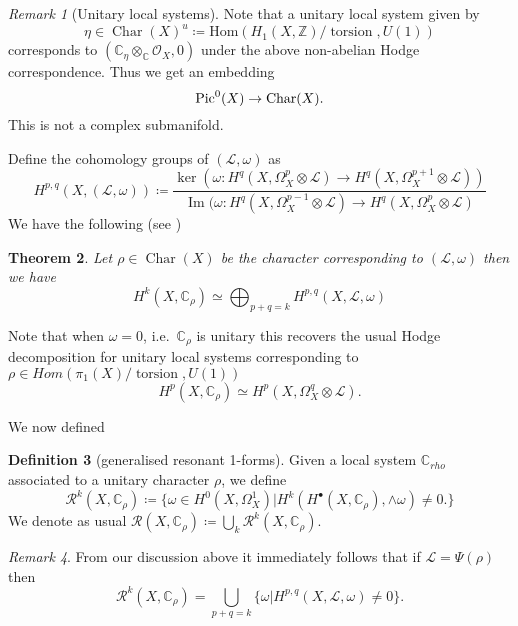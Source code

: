 \documentclass[12pt,reqno]{amsart}
\newtheorem{theorem}{Theorem}[section]
\theoremstyle{question}
\theoremstyle{definition}
\newtheorem{definition}[theorem]{Definition}
\theoremstyle{remark}
\newtheorem{remark}[theorem]{Remark}
\theoremstyle{cited}
\theoremstyle{citeddef}
\newcommand{\Hom}{\mathrm{Hom}}
\DeclareMathOperator{\Char}{Char}
\DeclareMathOperator{\im}{Im}
\def\Pic{{\rm Pic}}
\newcommand{\sL}{\mathcal{L}}
\newcommand{\sO}{\mathcal{O}}
\newcommand{\sR}{\mathcal{R}}
\newcommand{\bbC}{\mathbb{C}}
\newcommand{\bbZ}{\mathbb{Z}}
\DeclareMathOperator{\torsion}{torsion}
\begin{document}
\begin{remark}[Unitary local systems]
Note that a unitary local system given by
\[\eta\in\Char(X)^u \coloneqq \Hom(H_1(X,\bbZ)/\torsion , U(1))\]
corresponds to $(\bbC_{\eta}\otimes_{\bbC}\sO_X, 0)$
under the above non-abelian Hodge correspondence. Thus
we get an embedding 
\[\Pic^0(X) \to \Char(X).\]
This is not a complex submanifold.

\end{remark}

Define the cohomology groups of 
$(\sL, \omega)$ as
\[H^{p,q}(X, (\sL, \omega)) \coloneqq 
\frac{\ker(\omega\colon H^q(X, \Omega_X^p\otimes \sL)
\to H^q(X, \Omega_X^{p+1}\otimes\sL))}{\im(\omega\colon
H^q(X,\Omega_X^{p-1}\otimes\sL)\to H^q(X,\Omega_X^{p}\otimes\sL)}\]
We have the following (see \cite[Theorem 3]{Ara92})
\begin{theorem}
Let $\rho\in \Char(X)$ be the character corresponding to 
$(\sL,\omega)$ then we have
\[H^k(X, \bbC_{\rho}) \simeq \bigoplus_{p+q =k}H^{p,q}(X,\sL,\omega)\]
\label{thm:genhodgedecomp}
\end{theorem}

Note that when $\omega = 0$, i.e.\ $\bbC_{\rho}$ is unitary
this recovers the usual Hodge decomposition for 
unitary local systems corresponding to $\rho \in Hom(\pi_1(X)/\torsion, U(1))$
\[H^p(X, \bbC_{\rho}) \simeq H^p(X, \Omega_X^q\otimes\sL).\]

We now defined
\begin{definition}[generalised resonant 1-forms]
Given a local system $\bbC_{rho}$ associated to a unitary character $\rho$, we define
\[\sR^k(X, \bbC_{\rho}) \coloneqq
\{\omega\in H^0(X, \Omega_X^1)| H^k(H^{\bullet}(X, \bbC_{\rho}), \wedge\omega) \neq 0 .\}\]
We denote as usual 
$\sR(X, \bbC_{\rho}) \coloneqq \bigcup_k \sR^k(X, \bbC_{\rho})$.
\end{definition}

\begin{remark}
From our discussion above it immediately follows that
if $\sL = \Psi(\rho)$ then
\[\sR^k(X, \bbC_{\rho}) =\bigcup_{p+q = k} \{\omega| H^{p,q}(X, \sL,\omega) \neq 0\}.\]
\end{remark}
\end{document}
